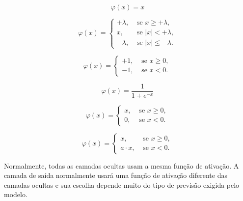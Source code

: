 \begin{equation}    \label{eq: ActFunc Linear}
    \varphi(x) = x
\end{equation}

\begin{equation}    \label{eq: ActFunc HardTanh}
    \varphi(x) =
    \begin{cases}
    + \lambda, & \text{ se } x \geq + \lambda,\\
    x,         & \text{ se } \left | x \right | < + \lambda,\\
    - \lambda, & \text{ se } \left | x \right | \leq - \lambda.
    \end{cases}
\end{equation}

\begin{equation}    \label{eq: ActFunc Step}
    \varphi(x) =
    \begin{cases}
    +1, & \text{ se } x \geq 0,\\
    -1, & \text{ se } x < 0.
    \end{cases}
\end{equation}

\begin{equation}    \label{eq: ActFunc Sigmoide}
    \varphi(x) = \frac{1}{1 + e^{-x}}
\end{equation}


\begin{equation}    \label{eq: ActFunc ReLu}
    \varphi(x) =
    \begin{cases}
    x, & \text{ se } x \geq 0,\\
    0, & \text{ se } x < 0.
    \end{cases}
\end{equation}

\begin{equation}    \label{eq: ActFunc LeakyReLu}
    \varphi(x) =
    \begin{cases}
    x,         & \text{ se } x \geq 0,\\
    a \cdot x, & \text{ se } x < 0.
    \end{cases}
\end{equation}

Normalmente, todas as camadas ocultas usam a mesma função de ativação. A camada de saída normalmente usará uma função de ativação diferente das camadas ocultas e sua escolha depende muito do tipo de previsão exigida pelo modelo.


